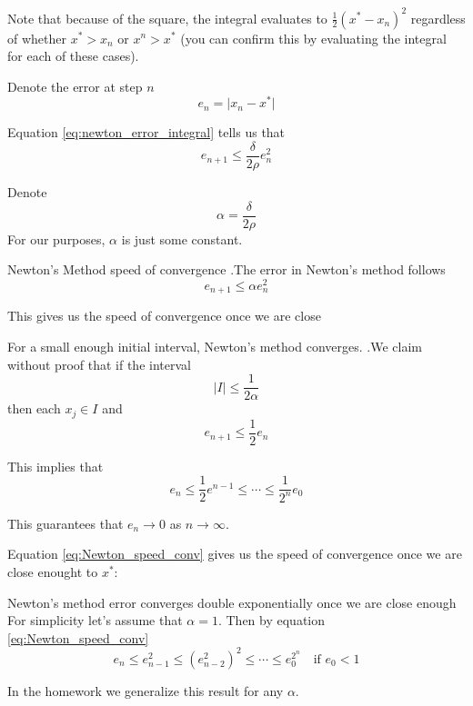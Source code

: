 \documentclass[12pt,letterpaper]{article}
\begin{document}
Note that because of the square, the integral evaluates to $\frac{1}{2}(x^* - x_n)^2$ regardless of whether $x^* > x_n$ or $x^n > x^*$ (you can confirm this by evaluating the integral for each of these cases).

Denote the error at step $n$
\begin{equation}
	e_n = \lvert x_n - x^* \rvert
\end{equation}

Equation \ref{eq:newton_error_integral} tells us that
\begin{equation}
	e_{n+1} \leq \frac{\delta}{2\rho} e_n^2
\end{equation}

Denote
\begin{equation}
	\alpha = \frac{\delta}{2\rho}
\end{equation}
For our purposes, $\alpha$ is just some constant.

\begin{theo}{Newton's Method speed of convergence}
.The error in Newton's method follows
\begin{equation} \label{eq:Newton_speed_conv}
	e_{n+1} \leq \alpha e_n^2
\end{equation}
\end{theo}

This gives us the speed of convergence once we are close 

\begin{theo}{For a small enough initial interval, Newton's method converges.}
.We claim without proof that if the interval
\begin{equation}
	\lvert I \rvert \leq \frac{1}{2\alpha}
\end{equation}
then each $x_j \in I$ and
\begin{equation}
	e_{n+1} \leq \frac{1}{2} e_n
\end{equation}
\end{theo}

This implies that
\begin{equation}
	e_n \leq \frac{1}{2} e^{n-1} \leq \cdots \leq \frac{1}{2^n} e_0
\end{equation}

This guarantees that $e_n \rightarrow 0$ as $n \rightarrow \infty$.

Equation \ref{eq:Newton_speed_conv} gives us the speed of convergence once we are close enought to $x^*$:

\begin{theo}{Newton's method error converges double exponentially once we are close enough}
For simplicity let's assume that $\alpha = 1$. Then by equation \ref{eq:Newton_speed_conv}
\begin{equation}
	e_n \leq e_{n-1}^2 \leq \left( e_{n-2}^2 \right)^2 \leq \cdots \leq e_0^{2^n} \quad \text{if } e_0 < 1
\end{equation}
\end{theo}
In the homework we generalize this result for any $\alpha$.
\end{document}
